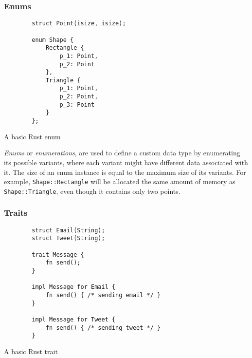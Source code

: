 \subsubsection*{Enums}

\begin{listing}[!htbp]

    \centering
    \begin{verbatim}
        struct Point(isize, isize);

        enum Shape {
            Rectangle {
                p_1: Point,
                p_2: Point
            },
            Triangle {
                p_1: Point,
                p_2: Point,
                p_3: Point
            }
        };
    \end{verbatim}

    \caption{A basic Rust enum}
    \label{lst:enum}
\end{listing}

\emph{Enums} or \emph{enumerations}, are used to define a custom data type by enumerating its possible variants, where each variant might have different data associated with it. The size of an enum instance is equal to the maximum size of its variants. For example, \texttt{Shape::Rectangle} will be allocated the same amount of memory as \texttt{Shape::Triangle}, even though it contains only two points.

\subsubsection*{Traits}

\begin{listing}[!htbp]

    \centering
    \begin{verbatim}
        struct Email(String);
        struct Tweet(String);

        trait Message {
            fn send();
        }

        impl Message for Email {
            fn send() { /* sending email */ }
        }

        impl Message for Tweet {
            fn send() { /* sending tweet */ }
        }
    \end{verbatim}

    \caption{A basic Rust trait}
    \label{lst:trait}
\end{listing}

